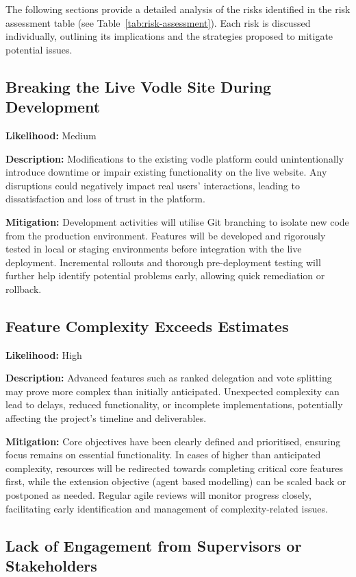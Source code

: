 The following sections provide a detailed analysis of the risks identified in the risk assessment table (see Table~\ref{tab:risk-assessment}). Each risk is discussed individually, outlining its implications and the strategies proposed to mitigate potential issues.

\subsection*{Breaking the Live Vodle Site During Development}

\textbf{Likelihood:} Medium

\textbf{Description:} Modifications to the existing vodle platform could unintentionally introduce downtime or impair existing functionality on the live website. Any disruptions could negatively impact real users' interactions, leading to dissatisfaction and loss of trust in the platform.

\textbf{Mitigation:} Development activities will utilise Git branching to isolate new code from the production environment. Features will be developed and rigorously tested in local or staging environments before integration with the live deployment. Incremental rollouts and thorough pre-deployment testing will further help identify potential problems early, allowing quick remediation or rollback.

\subsection*{Feature Complexity Exceeds Estimates}

\textbf{Likelihood:} High

\textbf{Description:} Advanced features such as ranked delegation and vote splitting may prove more complex than initially anticipated. Unexpected complexity can lead to delays, reduced functionality, or incomplete implementations, potentially affecting the project's timeline and deliverables.

\textbf{Mitigation:} Core objectives have been clearly defined and prioritised, ensuring focus remains on essential functionality. In cases of higher than anticipated complexity, resources will be redirected towards completing critical core features first, while the extension objective (agent based modelling) can be scaled back or postponed as needed. Regular agile reviews will monitor progress closely, facilitating early identification and management of complexity-related issues.

\subsection*{Lack of Engagement from Supervisors or Stakeholders}

